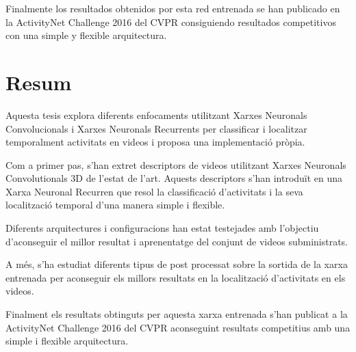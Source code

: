 Finalmente los resultados obtenidos por esta red entrenada se han publicado en la ActivityNet Challenge 2016 del CVPR consiguiendo resultados competitivos con una simple y flexible arquitectura.

\chapter*{Resum}

Aquesta tesis explora diferents enfocaments utilitzant Xarxes Neuronals Convolucionals i Xarxes Neuronals Recurrents per classificar i localitzar temporalment activitats en videos i proposa una implementació pròpia.

Com a primer pas, s'han extret descriptors de videos utilitzant Xarxes Neuronals Convolutionals 3D de l'estat de l'art. Aquests descriptors s'han introduït en una Xarxa Neuronal Recurren que resol la classificació d'activitats i la seva localització temporal d'una manera simple i flexible.

Diferents arquitectures i configuracions han estat testejades amb l'objectiu d'aconseguir el millor resultat i aprenentatge del conjunt de videos subministrats.

A més, s'ha estudiat diferents tipus de post processat sobre la sortida de la xarxa entrenada per aconseguir els millors resultats en la localització d'activitats en els videos.

Finalment els resultats obtinguts per aquesta xarxa entrenada s'han publicat a la ActivityNet Challenge 2016 del CVPR aconseguint resultats competitius amb una simple i flexible arquitectura.
